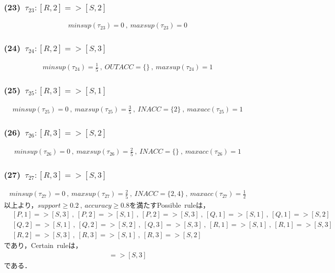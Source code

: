 \documentclass[a4paper,12pt]{jarticle}
\begin{document}
\subsubsection*{(23)~$\tau_{23}:[R,2]=>[S,2]$}
\vspace{-4mm}
%
\begin{align*}
 minsup(\tau_{23})=0~,~maxsup(\tau_{23})=0
\end{align*}
%
\vspace{-10mm}
\subsubsection*{(24)~$\tau_{24}:[R,2]=>[S,3]$}
\vspace{-4mm}
%
\begin{align*}
 minsup(\tau_{24})=\frac{1}{5}~,~OUTACC=\{\}~,~maxsup(\tau_{24})=1
\end{align*}
%
\vspace{-10mm}
\subsubsection*{(25)~$\tau_{25}:[R,3]=>[S,1]$}
\vspace{-4mm}
%
\begin{align*}
 minsup(\tau_{25})=0~,~maxsup(\tau_{25})=\frac{3}{5}~,~INACC=\{2\}~,~maxacc(\tau_{25})=1
\end{align*}
%
\vspace{-10mm}
\subsubsection*{(26)~$\tau_{26}:[R,3]=>[S,2]$}
\vspace{-4mm}
%
\begin{align*}
 minsup(\tau_{26})=0~,~maxsup(\tau_{26})=\frac{2}{5}~,~INACC=\{\}~,~maxacc(\tau_{26})=1
\end{align*}
%
\vspace{-10mm}
\subsubsection*{(27)~$\tau_{27}:[R,3]=>[S,3]$}
\vspace{-4mm}
%
\begin{align*}
 minsup(\tau_{27})=0~,~maxsup(\tau_{27})=\frac{2}{5}~,~INACC=\{2,4\}~,~maxacc(\tau_{27})=\frac{1}{2}
\end{align*}
%
以上より，$support\geq0.2~,~accuracy\geq0.8$を満たすPossible~ruleは，
%
\begin{align*}
 &[P,1]=>[S,3]~,~[P,2]=>[S,1]~,~[P,2]=>[S,3]~,~[Q,1]=>[S,1]~,~[Q,1]=>[S,2] \\
 &[Q,2]=>[S,1]~,~[Q,2]=>[S,2]~,~[Q,3]=>[S,3]~,~[R,1]=>[S,1]~,~[R,1]=>[S,3] \\
 &[R,2]=>[S,3]~,~[R,3]=>[S,1]~,~[R,3]=>[S,2]
\end{align*}
%
であり，Certain~ruleは，
%
\begin{align*}
 [R,2]=>[S,3]
\end{align*}
%
である．
\end{document}
